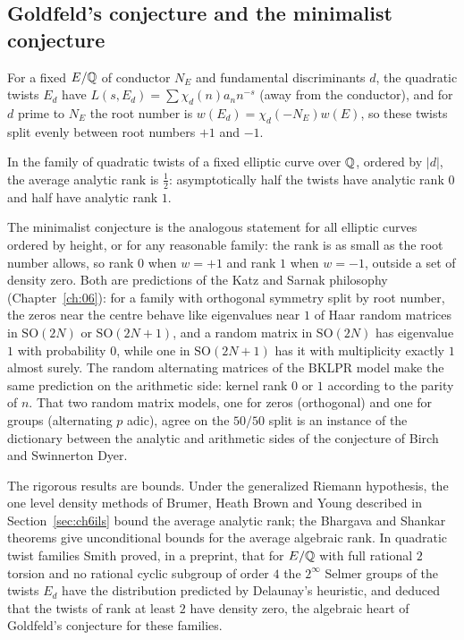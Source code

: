 \subsection{Goldfeld's conjecture and the minimalist conjecture}

For a fixed $E/\mathbb{Q}$ of conductor $N_E$ and fundamental discriminants $d$, the quadratic twists $E_d$ have $L(s,E_d) = \sum\chi_d(n)a_nn^{-s}$ (away from the conductor), and for $d$ prime to $N_E$ the root number is $w(E_d) = \chi_d(-N_E)w(E)$, so these twists split evenly between root numbers $+1$ and $-1$.

\begin{conjecture}\label{conj:06cgoldfeld}
In the family of quadratic twists of a fixed elliptic curve over $\mathbb{Q}$, ordered by $|d|$, the average analytic rank is $\frac12$: asymptotically half the twists have analytic rank $0$ and half have analytic rank $1$.
\end{conjecture}

The minimalist conjecture is the analogous statement for all elliptic curves ordered by height, or for any reasonable family: the rank is as small as the root number allows, so rank $0$ when $w = +1$ and rank $1$ when $w = -1$, outside a set of density zero. Both are predictions of the Katz and Sarnak philosophy (Chapter~\ref{ch:06}): for a family with orthogonal symmetry split by root number, the zeros near the centre behave like eigenvalues near $1$ of Haar random matrices in $\mathrm{SO}(2N)$ or $\mathrm{SO}(2N+1)$, and a random matrix in $\mathrm{SO}(2N)$ has eigenvalue $1$ with probability $0$, while one in $\mathrm{SO}(2N+1)$ has it with multiplicity exactly $1$ almost surely. The random alternating matrices of the BKLPR model make the same prediction on the arithmetic side: kernel rank $0$ or $1$ according to the parity of $n$. That two random matrix models, one for zeros (orthogonal) and one for groups (alternating $p$ adic), agree on the $50/50$ split is an instance of the dictionary between the analytic and arithmetic sides of the conjecture of Birch and Swinnerton Dyer.

The rigorous results are bounds. Under the generalized Riemann hypothesis, the one level density methods of Brumer, Heath Brown and Young described in Section~\ref{sec:ch6ils} bound the average analytic rank; the Bhargava and Shankar theorems give unconditional bounds for the average algebraic rank. In quadratic twist families Smith \cite{smith2017} proved, in a preprint, that for $E/\mathbb{Q}$ with full rational $2$ torsion and no rational cyclic subgroup of order $4$ the $2^\infty$ Selmer groups of the twists $E_d$ have the distribution predicted by Delaunay's heuristic, and deduced that the twists of rank at least $2$ have density zero, the algebraic heart of Goldfeld's conjecture for these families.

